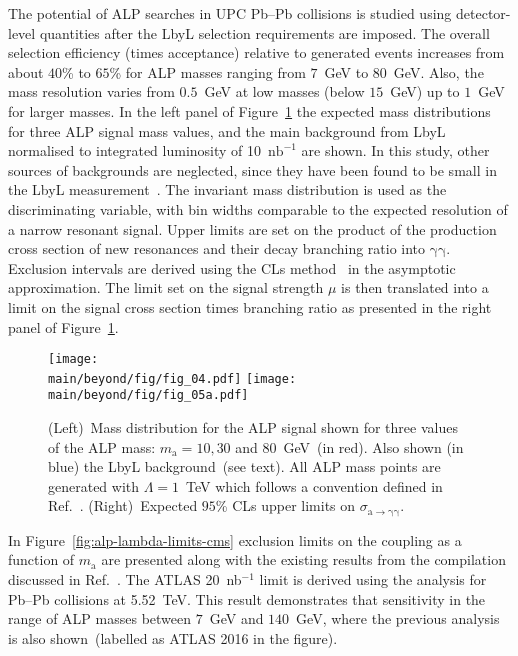 The potential of ALP searches in UPC Pb--Pb collisions is studied using detector-level quantities after the LbyL selection requirements are imposed. The overall selection efficiency (times acceptance) relative to generated events increases from about $40$\% to $65$\% for ALP masses ranging from $7$~GeV to $80$~GeV. Also, the mass resolution varies from $0.5$~GeV at low masses (below $15$~GeV) up to $1$~GeV for larger masses. In the left panel of Figure~\ref{fig:alp} the expected mass distributions for three ALP signal mass values, and the main background from LbyL normalised to integrated luminosity of 10~$\mathrm{nb}^{-1}$ are shown. In this study, other sources of backgrounds are neglected, since they have been found to be small in the LbyL measurement~\cite{Aaboud:2017bwk}. The invariant mass distribution is used as the discriminating variable, with bin widths comparable to the expected resolution of a narrow resonant signal.
Upper limits are set on the product of the production cross section of
new resonances and their decay branching ratio into $\mathrm{\gamma\gamma}$. Exclusion intervals are derived using the CLs method~\cite{Read:2002hq} in the asymptotic approximation. The limit set on the signal strength $\mu$ is then translated into a limit on the signal cross section times branching ratio as presented in the right panel of Figure~\ref{fig:alp}.
\begin{figure}[!htbp]
\centering
  \texttt{[image: \\main/beyond/fig/fig\_04.pdf]}
  \texttt{[image: \\main/beyond/fig/fig\_05a.pdf]}
  \caption{(Left)~Mass distribution for the ALP signal
  shown for three values of the ALP mass: $m_\mathrm{a}=10, 30$ and
  $80$~GeV~(in red). Also shown (in blue) the LbyL background~(see
  text). All ALP mass points are generated with $\Lambda = 1$~TeV which follows a convention defined in Ref.~\cite{Knapen:2016moh}.
  (Right)~Expected $95$\% CLs upper limits on $\sigma_{\mathrm{a\rightarrow \gamma \gamma}}$.}
  \label{fig:alp}
\end{figure}

In Figure~\ref{fig:alp-lambda-limits-cms} exclusion limits on the coupling as a function of $m_\mathrm{a}$ are presented along with the existing results from the compilation discussed in Ref.~\cite{Baldenegro:2018hng}. The ATLAS 20~nb$^{-1}$ limit is derived using the analysis for Pb--Pb collisions at 5.52~TeV. This result demonstrates that  sensitivity in the range of ALP masses between $7$~GeV and $140$~GeV, where the previous analysis~\cite{Knapen:2016moh} is also shown~(labelled as ATLAS 2016 in the figure).

